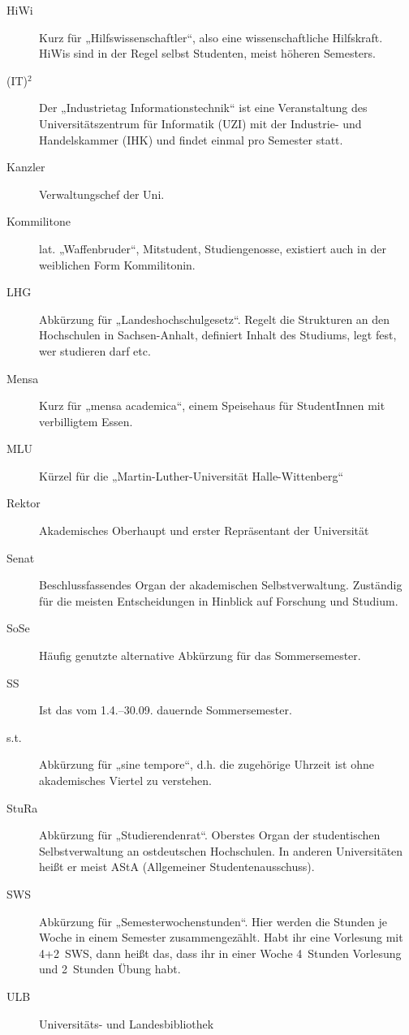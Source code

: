 \begin{description}
\item[HiWi] Kurz für „Hilfswissenschaftler“, also eine wissenschaftliche Hilfskraft.
            HiWis sind in der Regel selbst Studenten, meist höheren Semesters.
\item[(IT)$^2$] Der „Industrietag Informationstechnik“ ist eine Veranstaltung des Universitätszentrum für Informatik (UZI)
                mit der Industrie- und Handelskammer (IHK) und findet einmal pro Semester statt.
\item[Kanzler] Verwaltungschef der Uni.
\item[Kommilitone] lat. „Waffenbruder“, Mitstudent, Studiengenosse, existiert auch in der weiblichen Form Kommilitonin.
\item[LHG] Abkürzung für „Landeshochschulgesetz“.
           Regelt die Strukturen an den Hochschulen in Sachsen-Anhalt, definiert Inhalt des Studiums, legt fest, wer studieren darf etc.
\item[Mensa] Kurz für „mensa academica“, einem Speisehaus für StudentInnen mit verbilligtem Essen.
\item[MLU] Kürzel für die „Martin-Luther-Universität Halle-Wittenberg“
\item[Rektor] Akademisches Oberhaupt und erster Repräsentant der Universität
\item[Senat] Beschlussfassendes Organ der akademischen Selbstverwaltung.
             Zuständig für die meisten Entscheidungen in Hinblick auf Forschung und Studium.
\item[SoSe] Häufig genutzte alternative Abkürzung für das Sommersemester.
\item[SS] Ist das vom 1.4.--30.09. dauernde Sommersemester.
\item[s.t.] Abkürzung für „sine tempore“, d.h. die zugehörige Uhrzeit ist ohne akademisches Viertel zu verstehen.
\item[StuRa] Abkürzung für „Studierendenrat“. Oberstes Organ der studentischen Selbstverwaltung an ostdeutschen Hochschulen.
             In anderen Universitäten heißt er meist AStA (Allgemeiner Studentenausschuss).\\
\item[SWS] Abkürzung für „Semesterwochenstunden“. Hier werden die Stunden je Woche in einem Semester zusammengezählt.
           Habt ihr eine Vorlesung mit 4+2~SWS, dann heißt das, dass ihr in einer Woche 4~Stunden Vorlesung und 2~Stunden Übung habt.
\item[ULB] Universitäts- und Landesbibliothek\\

\end{description}
